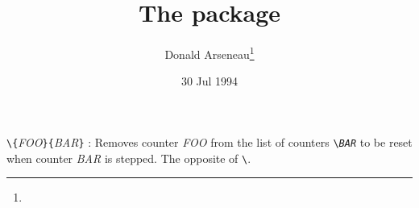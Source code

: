 \documentclass[pagesize=auto, fontsize=14pt, DIV=9, parskip=half]{scrartcl}
\title{The \pkg{removefr} package}
\author{Donald Arseneau\thanks{\mail{asnd@erich.triumf.ca}}}
\date{30 Jul 1994}
\makeatletter
\newcommand*{\cs}[1]{\texttt{\textbackslash#1}}
\newcommand*{\cmd}[1]{\cs{\expandafter\@gobble\string#1}}
\newcommand*{\meta}[1]{\textlangle\textsl{#1}\textrangle}
\newcommand*{\marg}[1]{\texttt{\{}\meta{#1}\texttt{\}}}
\makeatother
\begin{document}
\maketitle

\cmd{\@removefromreset}\marg{FOO}\marg{BAR} : Removes counter \meta{FOO} from the list of
counters \cmd{\cl@\meta{BAR}} to be reset when counter \meta{BAR}
is stepped.  The opposite of \cmd{\@addtoreset}.
\end{document}
